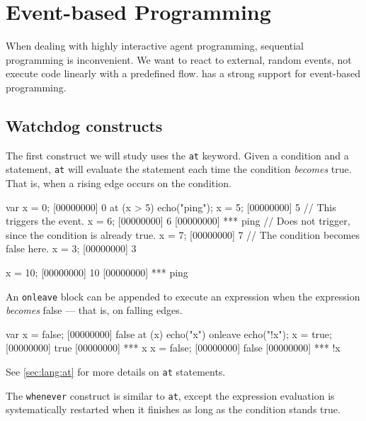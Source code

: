 
\chapter{Event-based Programming}
\label{sec:tut:event-prog}

When dealing with highly interactive agent programming, sequential
programming is inconvenient. We want to react to external, random
events, not execute code linearly with a predefined flow. \us has a
strong support for event-based programming.

\section{Watchdog constructs}

The first construct we will study uses the \lstinline|at| keyword. Given a
condition and a statement, \lstinline|at| will evaluate the statement each
time the condition \emph{becomes} true. That is, when a rising edge occurs
on the condition.

\begin{urbiscript}[firstnumber=1]
var x = 0;
[00000000] 0
at (x > 5)
  echo("ping");
x = 5;
[00000000] 5
// This triggers the event.
x = 6;
[00000000] 6
[00000000] *** ping
// Does not trigger, since the condition is already true.
x = 7;
[00000000] 7
// The condition becomes false here.
x = 3;
[00000000] 3

x = 10;
[00000000] 10
[00000000] *** ping
\end{urbiscript}

An \lstinline|onleave| block can be appended to execute an expression when
the expression \emph{becomes} false --- that is, on falling edges.

\begin{urbiscript}[firstnumber=1]
var x = false;
[00000000] false
at (x)
  echo("x")
onleave
  echo("!x");
x = true;
[00000000] true
[00000000] *** x
x = false;
[00000000] false
[00000000] *** !x
\end{urbiscript}

See \autoref{sec:lang:at} for more details on \lstinline|at| statements.

The \lstinline|whenever| construct is similar to \lstinline|at|, except the
expression evaluation is systematically restarted when it finishes as long
as the condition stands true.


